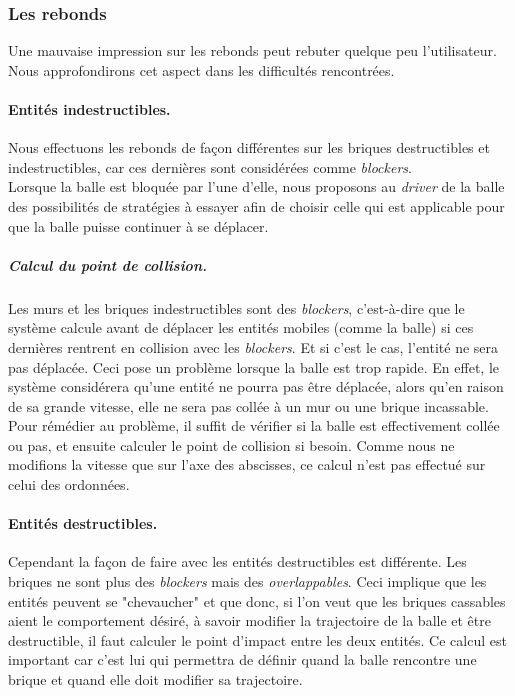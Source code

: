 \documentclass[a4paper,10pt]{article}
\begin{document}
    \subsubsection{Les rebonds}
        Une mauvaise impression sur les rebonds peut rebuter quelque peu l'utilisateur. Nous approfondirons
        cet aspect dans les difficultés rencontrées.

        \paragraph{Entités indestructibles.}
        Nous effectuons les rebonds de façon
        différentes sur les briques destructibles et indestructibles, car ces dernières sont considérées comme \textit{blockers}. \\
        Lorsque la balle est bloquée par l'une d'elle, nous proposons au \textit{driver} de la balle des possibilités
        de stratégies à essayer afin de choisir celle qui est applicable pour que la balle puisse continuer à se déplacer.

		\subparagraph{Calcul du point de collision.}
            Les murs et les briques indestructibles sont des \textit{blockers}, c'est-à-dire que le système calcule avant de
            déplacer les entités mobiles (comme la balle) si ces dernières rentrent en collision avec les \textit{blockers}.
            Et si c'est le cas, l'entité ne sera pas déplacée. Ceci pose un problème lorsque la balle est trop rapide. En
            effet, le système considérera qu'une entité ne pourra pas être déplacée, alors qu'en raison de sa grande vitesse,
            elle ne sera pas collée à un mur ou une brique incassable. Pour rémédier au problème, il suffit de vérifier si
            la balle est effectivement collée ou pas, et ensuite calculer le point de collision si besoin.
            Comme nous ne modifions la vitesse que sur l'axe des abscisses, ce calcul n'est pas effectué sur celui des
            ordonnées.

        \paragraph{Entités destructibles.}
		Cependant la façon de faire avec les entités destructibles est différente. Les briques ne sont plus des \textit{blockers}
		mais des \textit{overlappables}. Ceci implique que les entités peuvent se "chevaucher" et que donc, si l'on veut que les
		briques cassables aient le comportement désiré, à savoir modifier la trajectoire de la balle et être destructible, il faut
		calculer le point d'impact entre les deux entités. Ce calcul est important car c'est lui qui permettra de définir
		quand la balle rencontre une brique et quand elle doit modifier sa trajectoire.
\end{document}
